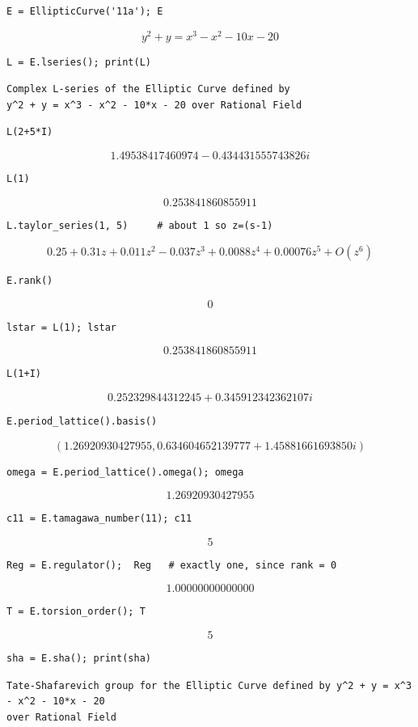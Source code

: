 \documentclass{book}
\begin{document}
\begin{lstlisting}
E = EllipticCurve('11a'); E
\end{lstlisting}$$y^2 + y = x^{3} -  x^{2} - 10 x - 20 $$
\begin{lstlisting}
L = E.lseries(); print(L)
\end{lstlisting}
\begin{verbatim}
Complex L-series of the Elliptic Curve defined by
y^2 + y = x^3 - x^2 - 10*x - 20 over Rational Field
\end{verbatim}
\begin{lstlisting}
L(2+5*I)
\end{lstlisting}
$$1.49538417460974 - 0.434431555743826i$$
\begin{lstlisting}
L(1)
\end{lstlisting}$$0.253841860855911$$
\begin{lstlisting}
L.taylor_series(1, 5)     # about 1 so z=(s-1)
\end{lstlisting}$$0.25 + 0.31z + 0.011z^{2} - 0.037z^{3} + 0.0088z^{4} + 0.00076z^{5} + O(z^{6})$$
\begin{lstlisting}
E.rank()
\end{lstlisting}$$0$$
\begin{lstlisting}
lstar = L(1); lstar
\end{lstlisting}$$0.253841860855911$$
\begin{lstlisting}
L(1+I)
\end{lstlisting}$$0.252329844312245 + 0.345912342362107i$$
\begin{lstlisting}
E.period_lattice().basis()
\end{lstlisting}$$\left(1.26920930427955, 0.634604652139777 + 1.45881661693850i\right)$$
\begin{lstlisting}
omega = E.period_lattice().omega(); omega
\end{lstlisting}$$1.26920930427955$$
\begin{lstlisting}
c11 = E.tamagawa_number(11); c11
\end{lstlisting}$$5$$
\begin{lstlisting}
Reg = E.regulator();  Reg   # exactly one, since rank = 0
\end{lstlisting}$$1.00000000000000$$
\begin{lstlisting}
T = E.torsion_order(); T
\end{lstlisting}$$5$$
\begin{lstlisting}
sha = E.sha(); print(sha)
\end{lstlisting}\begin{verbatim}Tate-Shafarevich group for the Elliptic Curve defined by y^2 + y = x^3 - x^2 - 10*x - 20
over Rational Field\end{verbatim}
\end{document}
